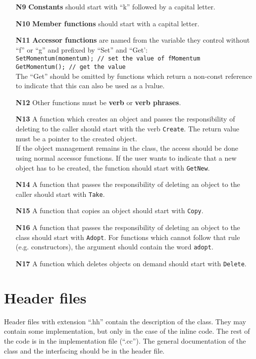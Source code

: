 \documentclass[a4paper,10pt]{article}
\begin{document}
\begin{itemize}
\item[\bf N9] {\bf Constants} should start with ``k'' followed by a capital
  letter.
\item[\bf N10] {\bf Member functions} should start with a capital letter.
\item[\bf N11] {\bf Accessor functions} are named from the variable they
  control without ``f'' or ``g'' and prefixed by ``Set'' and ``Get':\\
  {\tt SetMomentum(momentum);   // set the value of fMomentum \\
       GetMomentum();           // get the value }\\
  The ``Get'' should be omitted by functions which return a non-const
  reference to indicate that this can also be used as a lvalue.
\item[\bf N12] Other functions must be {\bf verb} or {\bf verb phrases}.
\item[\bf N13] A function which creates an object and passes the responsibility
  of deleting to the caller should start with the verb {\tt Create}. The
  return value must be a pointer to the created object.\\
  If the object management remains in the class, the access should be done
  using normal accessor functions. If the user wants to indicate that a
  new object has to be created, the function should start with {\tt GetNew}.
\item[\bf N14] A function that passes the responsibility of deleting an
  object to the caller should start with {\tt Take}.
\item[\bf N15] A function that copies an object should start with {\tt Copy}.
\item[\bf N16] A function that passes the responsibility of deleting an
  object to the class should start with {\tt Adopt}. For functions which cannot
  follow that rule (e.g. constructors), the argument should contain the
  word {\tt adopt}.
\item[\bf N17] A function which deletes objects on demand should start with
  {\tt Delete}.
\end{itemize}

\section{Header files}

Header files with extension ``.hh'' contain the description of the class.
They may contain some implementation, but only in the case of the inline
code. The rest of the code is in the implementation file (``.cc''). The
general documentation of the class and the interfacing should be in
the header file.
\end{document}
